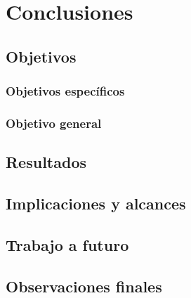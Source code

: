 \chapter{Conclusiones}
\label{cap:conclusiones}


\section{Objetivos}

\subsection{Objetivos específicos}

\subsection{Objetivo general}

\section{Resultados}


\section{Implicaciones y alcances}

\section{Trabajo a futuro}

\section{Observaciones finales}

